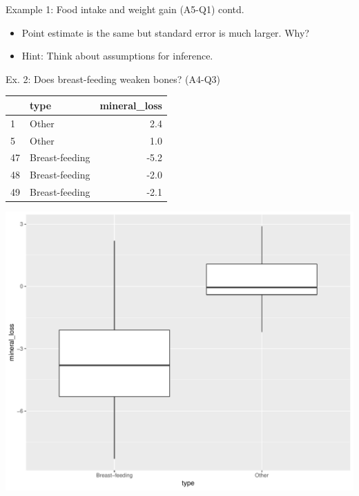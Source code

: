 \documentclass[handout]{beamer}\usepackage[]{graphicx}\usepackage[]{color}
\newenvironment{knitrout}{}{} %
\begin{document}
\begin{frame}[fragile]{Example 1: Food intake and weight gain (A5-Q1) contd.}
\begin{minipage}{0.5\textwidth}
\begin{knitrout}
\end{knitrout}

	\begin{itemize}
	\small
	\setlength\itemsep{2em}
	\item Point estimate is the same but standard error is much larger. Why? \pause 
	\item Hint: Think about assumptions for inference.
\end{itemize}

\end{minipage}

\end{frame}



\begin{frame}[fragile]{Ex. 2: Does breast-feeding weaken bones? (A4-Q3)}

\begin{minipage}{0.47\textwidth}
\begin{knitrout}\scriptsize
{}\color{fgcolor}
\begin{tabular}{l|l|r}
\hline
  & type & mineral\_loss\\
\hline
1 & Other & 2.4\\
\hline
5 & Other & 1.0\\
\hline
47 & Breast-feeding & -5.2\\
\hline
48 & Breast-feeding & -2.0\\
\hline
49 & Breast-feeding & -2.1\\
\hline
\end{tabular}



{\centering \includegraphics[width=1\linewidth]{figure/unnamed-chunk-13-1} 

}
\end{knitrout}
\end{minipage}
\end{frame}
\end{document}
